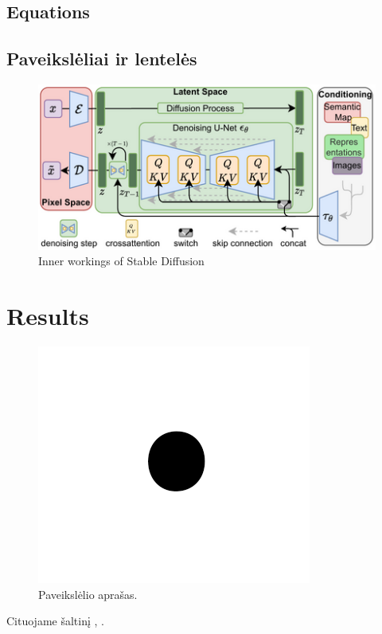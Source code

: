 \documentclass[conference]{IEEEtran}
\begin{document}
\subsection{Equations}



\subsection{Paveikslėliai ir lentelės}

\begin{figure}[!h] %
\centerline{\includegraphics[scale=1.8]{diff.png}}
\caption{Inner workings of Stable Diffusion}
\label{fig}
\end{figure}


\section{Results}

\begin{figure}[ht] %
\centerline{\includegraphics{fig1.png}}
\caption{Paveikslėlio aprašas.}
\label{fig}
\end{figure}

Cituojame šaltinį \cite{lecun2015deep}, \cite{desai2021redcaps}.

%
%
\printbibliography[heading=bibintoc]
\end{document}
